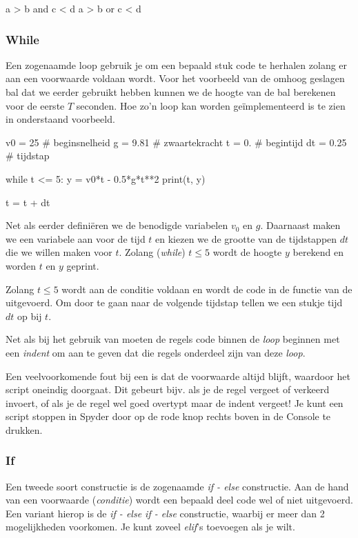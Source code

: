 \documentclass[a4paper,11pt, fleqn]{article}
\begin{document}
\begin{python}
a > b and c < d
a > b or c < d
\end{python}

\subsubsection{While}
Een zogenaamde  loop gebruik je om een bepaald stuk code te herhalen zolang er aan een voorwaarde voldaan wordt. Voor het voorbeeld van de omhoog geslagen bal dat we eerder gebruikt hebben kunnen we de hoogte van de bal berekenen voor de eerste $T$ seconden. Hoe zo'n loop kan worden ge\"implementeerd is te zien in onderstaand voorbeeld.

\begin{python}
v0 = 25   # beginsnelheid
g = 9.81  # zwaartekracht
t = 0.    # begintijd
dt = 0.25 # tijdstap

while t <= 5:
    y = v0*t - 0.5*g*t**2
    print(t, y)
    
    t = t + dt
\end{python}

Net als eerder defini\"eren we de benodigde variabelen $v_0$ en $g$. Daarnaast maken we een variabele aan voor de tijd $t$ en kiezen we de grootte van de tijdstappen $dt$ die we willen maken voor $t$. Zolang (\textit{while}) $t \leq 5$ wordt de hoogte $y$ berekend en worden $t$ en $y$ geprint.

Zolang $t\le5$ wordt aan de conditie voldaan en wordt de code in de functie van de  uitgevoerd. Om door te gaan naar de volgende tijdstap tellen we een stukje tijd $dt$ op bij $t$. 

Net als bij het gebruik van  moeten de regels code binnen de  \textit{loop} beginnen met een \textit{indent} om aan te geven dat die regels onderdeel zijn van deze \textit{loop}.

Een veelvoorkomende fout bij een  is dat de voorwaarde altijd  blijft, waardoor het script oneindig doorgaat. Dit gebeurt bijv. als je de regel  vergeet of verkeerd invoert, of als je de regel wel goed overtypt maar de indent vergeet! Je kunt een script stoppen in Spyder door op de rode knop rechts boven in de Console te drukken.

\subsubsection{If}
Een tweede soort constructie is de zogenaamde \textit{if - else} constructie. Aan de hand van een voorwaarde (\textit{conditie}) wordt een bepaald deel code wel of niet uitgevoerd. Een variant hierop is de \textit{if - else if - else} constructie, waarbij er meer dan 2 mogelijkheden voorkomen. Je kunt zoveel {\it elif}'s toevoegen als je wilt.
\end{document}
